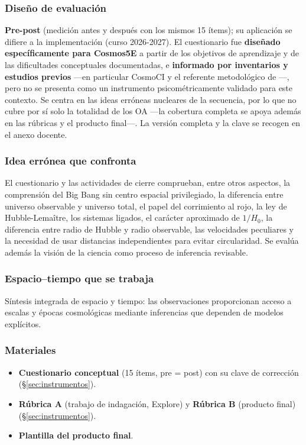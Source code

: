 \subsubsection*{Diseño de evaluación}

\textbf{Pre-post} (medición antes y después con los mismos 15 ítems); su aplicación se difiere a la implementación (curso 2026-2027). El cuestionario fue \textbf{diseñado específicamente para Cosmos5E} a partir de los objetivos de aprendizaje y de las dificultades conceptuales documentadas, e \textbf{informado por inventarios y estudios previos} ---en particular CosmoCI y el referente metodológico de \textcite{gasparini2025}---, pero no se presenta como un instrumento psicométricamente validado para este contexto. Se centra en las ideas erróneas nucleares de la secuencia, por lo que no cubre por sí solo la totalidad de los OA ---la cobertura completa se apoya además en las rúbricas y el producto final---. La versión completa y la clave se recogen en el anexo docente.

\subsubsection*{Idea errónea que confronta}

El cuestionario y las actividades de cierre comprueban, entre otros aspectos, la comprensión del Big Bang sin centro espacial privilegiado, la diferencia entre universo observable y universo total, el papel del corrimiento al rojo, la ley de Hubble-Lemaître, los sistemas ligados, el carácter aproximado de $1/H_0$, la diferencia entre radio de Hubble y radio observable, las velocidades peculiares y la necesidad de usar distancias independientes para evitar circularidad. Se evalúa además la visión de la ciencia como proceso de inferencia revisable.

\subsubsection*{Espacio--tiempo que se trabaja}

Síntesis integrada de espacio y tiempo: las observaciones proporcionan acceso a escalas y épocas cosmológicas mediante inferencias que dependen de modelos explícitos.

\subsubsection*{Materiales}

\begin{itemize}
\item \textbf{Cuestionario conceptual} (15 ítems, pre = post) con su clave de corrección (§\ref{sec:instrumentos}).
\item \textbf{Rúbrica A} (trabajo de indagación, Explore) y \textbf{Rúbrica B} (producto final) (§\ref{sec:instrumentos}).
\item \textbf{Plantilla del producto final}.
\end{itemize}

